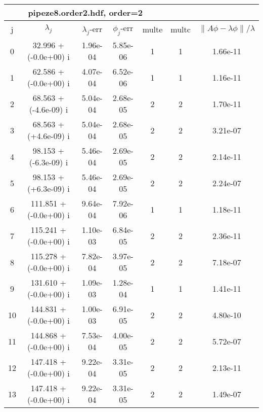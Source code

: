 \begin{table}[H]\tableFont %
\begin{center}
\begin{tabular}{|c|c|c|c|c|c|c|}  \hline
\multicolumn{5}{|c|}{pipeze8.order2.hdf, order=2} \\ \hline
   j    &         $\lambda_j$        & $\lambda_j$-err  & $\phi_j$-err  & multe & multc & $\| A\phi - \lambda\phi\|/\lambda$     \\ \hline
     0  &     32.996 + (-0.0e+00) i  &    1.96e-04      &   5.85e-06    &   1    &  1   &    1.66e-11 \\
     1  &     62.586 + (-0.0e+00) i  &    4.07e-04      &   6.52e-06    &   1    &  1   &    1.16e-11 \\
     2  &     68.563 + (-4.6e-09) i  &    5.04e-04      &   2.68e-05    &   2    &  2   &    1.70e-11 \\
     3  &     68.563 + (+4.6e-09) i  &    5.04e-04      &   2.68e-05    &   2    &  2   &    3.21e-07 \\
     4  &     98.153 + (-6.3e-09) i  &    5.46e-04      &   2.69e-05    &   2    &  2   &    2.14e-11 \\
     5  &     98.153 + (+6.3e-09) i  &    5.46e-04      &   2.69e-05    &   2    &  2   &    2.24e-07 \\
     6  &    111.851 + (-0.0e+00) i  &    9.64e-04      &   7.92e-06    &   1    &  1   &    1.18e-11 \\
     7  &    115.241 + (-0.0e+00) i  &    1.10e-03      &   6.84e-05    &   2    &  2   &    2.36e-11 \\
     8  &    115.278 + (-0.0e+00) i  &    7.82e-04      &   3.97e-05    &   2    &  2   &    7.18e-07 \\
     9  &    131.610 + (-0.0e+00) i  &    1.09e-03      &   1.28e-04    &   1    &  1   &    1.41e-11 \\
    10  &    144.831 + (-0.0e+00) i  &    1.00e-03      &   6.91e-05    &   2    &  2   &    4.80e-10 \\
    11  &    144.868 + (-0.0e+00) i  &    7.53e-04      &   4.00e-05    &   2    &  2   &    5.72e-07 \\
    12  &    147.418 + (-0.0e+00) i  &    9.22e-04      &   3.31e-05    &   2    &  2   &    2.13e-11 \\
    13  &    147.418 + (-0.0e+00) i  &    9.22e-04      &   3.31e-05    &   2    &  2   &    1.49e-07 \\

\end{tabular}
\end{center}
\end{table}
